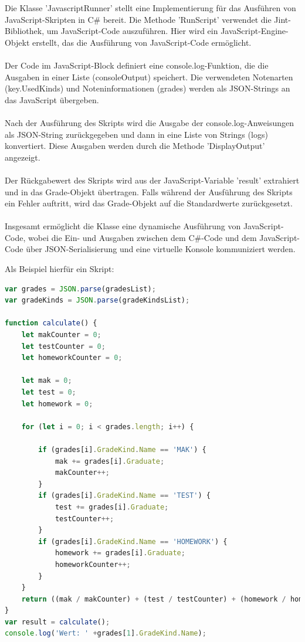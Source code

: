 Die Klasse 'JavascriptRunner' stellt eine Implementierung für das Ausführen von JavaScript-Skripten 
in C\# bereit. Die Methode 'RunScript' verwendet die Jint-Bibliothek, um JavaScript-Code auszuführen. 
Hier wird ein JavaScript-Engine-Objekt erstellt, das die Ausführung von JavaScript-Code ermöglicht.
\\\\
Der Code im JavaScript-Block definiert eine console.log-Funktion, die die Ausgaben in einer 
Liste (consoleOutput) speichert. Die verwendeten Notenarten (key.UsedKinds) und Noteninformationen (grades) 
werden als JSON-Strings an das JavaScript übergeben.
\\\\
Nach der Ausführung des Skripts wird die Ausgabe der console.log-Anweisungen als JSON-String zurückgegeben 
und dann in eine Liste von Strings (logs) konvertiert. Diese Ausgaben werden durch die 
Methode 'DisplayOutput' angezeigt.
\\\\
Der Rückgabewert des Skripts wird aus der JavaScript-Variable 'result' extrahiert und in das Grade-Objekt 
übertragen. Falls während der Ausführung des Skripts ein Fehler auftritt, wird das Grade-Objekt auf 
die Standardwerte zurückgesetzt.
\\\\
Insgesamt ermöglicht die Klasse eine dynamische Ausführung von JavaScript-Code, wobei die Ein- und Ausgaben 
zwischen dem C\#-Code und dem JavaScript-Code über JSON-Serialisierung und eine 
virtuelle Konsole kommuniziert werden.



\newpage
Als Beispiel hierfür ein Skript:
\begin{lstlisting}[language={JavaScript},caption=Javascript-Skript,label=lst:impl:jstest]
var grades = JSON.parse(gradesList);
var gradeKinds = JSON.parse(gradeKindsList);

function calculate() {
    let makCounter = 0;
    let testCounter = 0;
    let homeworkCounter = 0;

    let mak = 0;
    let test = 0;
    let homework = 0;

    for (let i = 0; i < grades.length; i++) {

        if (grades[i].GradeKind.Name == 'MAK') {
            mak += grades[i].Graduate;
            makCounter++;
        }
        if (grades[i].GradeKind.Name == 'TEST') {
            test += grades[i].Graduate;
            testCounter++;
        }
        if (grades[i].GradeKind.Name == 'HOMEWORK') {
            homework += grades[i].Graduate;
            homeworkCounter++;
        }
    }
    return ((mak / makCounter) + (test / testCounter) + (homework / homeworkCounter)) / 3;
}
var result = calculate();
console.log('Wert: ' +grades[1].GradeKind.Name);
\end{lstlisting}

